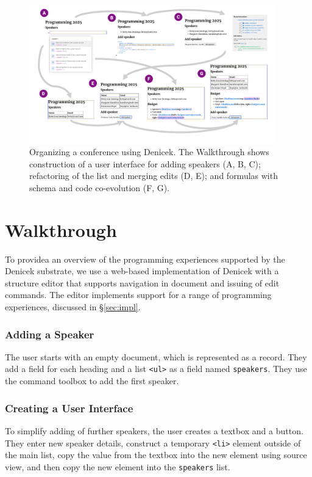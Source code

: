 \documentclass[sigconf]{acmart}
\newcommand*\circled[1]{\textnormal{\footnotesize\sffamily\bfseries\protect\tikz[baseline=(char.base)]{
  \node[shape=circle,fill=black,text=white,draw,inner sep=1pt] (char) {#1};}}}
\begin{document}
\begin{figure}[t]
\vspace{-0.5em}
\includegraphics[width=0.95\textwidth,clip,trim=1cm 1cm 1cm 0.5cm]{fig/walkthrough.pdf}
\vspace{-1em}
\caption{Organizing a conference using Denicek. The Walkthrough shows construction of a user
  interface for adding speakers (A, B, C); refactoring of the list and merging edits (D, E); and
  formulas with schema and code co-evolution (F, G).}
\label{fig:walkthrough}
\end{figure}

\newpage


\section{Walkthrough}
\label{sec:walk}

To providea an overview of the programming experiences supported by the Denicek
substrate, we use a web-based implementation of Denicek with a structure
editor that supports navigation in document and issuing of edit commands. The editor
implements support for a range of programming experiences, discussed in \S\ref{sec:impl}.

\subsubsection*{\circled{A} Adding a Speaker}
The user starts with an empty document, which is represented as a record. They add a field for
each heading and a list {\small\Verb_<ul>_} as a field named {\small\Verb_speakers_}. They use the command
toolbox to add the first speaker.

\subsubsection*{\circled{B} Creating a User Interface} To simplify adding of
further speakers, the user creates a textbox and a button. They enter new speaker
details, construct a temporary {\small\Verb_<li>_} element outside of the main list, copy the value
from the textbox into the new element using source view, and then copy the new element into the
{\small\Verb_speakers_} list.
\end{document}
